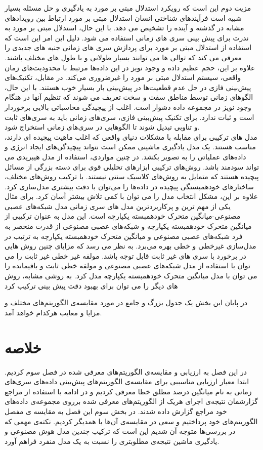  مزیت دوم این است که رویکرد استدلال مبتی بر مورد به یادگیری و حل مسئله بسیار شبیه است
فرآیندهای شناختی انسان استدلال مبتی بر مورد ارتباط بین رویدادهای مشابه در گذشته و آینده را تشخیص می دهد. با این حال، استدلال مبتی بر مورد به ندرت برای پیش بینی سری های زمانی استفاده می شود.
 دلیل این امر این است که استفاده از استدلال مبتی بر مورد برای پردازش سری های زمانی جنبه های جدیدی را معرفی می کند که توالی ها می توانند بسیار طولانی و با طول های مختلف باشند. 
 علاوه بر این، حجم عظیم داده و وجود نویز در این داده‌ها مرتبط با محدودیت‌های زمان واقعی، سیستم استدلال مبتی بر مورد را غیرضروری می‌کند.
  در مقابل، تکنیک‌های پیش‌بینی فازی در حل عدم قطعیت‌ها در پیش‌بینی بار بسیار خوب هستند.
 با این حال، الگوهای زمانی توسط مناطق سفت و سخت تعریف می شوند که تنظیم آنها در هنگام وجود نویز در مجموعه داده دشوار است. 
 اغلب از پیچیدگی محاسباتی بالایی برخوردار است و ثبات ندارد.
  برای تکنیک پیش‌بینی فازی، سری‌های زمانی باید به سری‌های ثابت و تناوبی تبدیل شوند تا الگوهایی در سری‌های زمانی استخراج شود.
  \\
  مدل های ترکیبی برای مقابله با مشکلات دنیای واقعی که
   اغلب ماهیت پیچیده ای دارند، مناسب هستند. یک مدل یادگیری ماشینی ممکن است نتواند پیچیدگی‌های ایجاد انرژی و داده‌های عملیاتی را به تصویر بکشد.
   در چنین مواردی، استفاده از مدل هیبریدی می تواند سودمند باشد. روش‌های ترکیبی ابزارهای تحلیلی قوی برای دسته بزرگی از مسائل پیچیده هستند
   که متمایل به روش‌های کلاسیک سنتی نیستند. با ترکیب روش‌های مختلف، ساختارهای خودهمبستگی پیچیده در داده‌ها را می‌توان با دقت بیشتری مدل‌سازی کرد. 
  علاوه بر این، مشکل انتخاب مدل را می توان با کمی تلاش بیشتر آسان کرد. برای مثال یکی از مهم ترین و پرکاربردترین مدل های سری زمانی مدل شبکه‌های عصبی مصنوعی-میانگین متحرک خودهمبسته یکپارچه
   است. این مدل به عنوان ترکیبی 
  از میانگین متحرک خودهمبسته یکپارچه و شبکه‌های عصبی مصنوعی از قدرت منحصر به فرد شبکه‌های عصبی مصنوعی و میانگین متحرک خودهمبسته یکپارچه به ترتیب در مدل‌سازی غیرخطی و خطی بهره می‌برد. به نظر می رسد که مزایای چنین روش هایی در برخورد
   با سری های غیر ثابت قابل توجه باشد. مولفه غیر خطی غیر ثابت را می توان با استفاده از مدل شبکه‌های عصبی مصنوعی و مولفه خطی ثابت
    و باقیمانده را می توان با مدل میانگین متحرک خودهمبسته یکپارچه مدل کرد. به روشی مشابه، روش های دیگر را می توان برای بهبود دقت پیش بینی ترکیب کرد


    در پایان این بخش یک جدول بزرگ و جامع در مورد مقایسه‌ی الگوریتم‌های مختلف و مزایا و معایب هرکدام خواهد آمد.
\section{خلاصه}


در این فصل به ارزیابی و مقایسه‌ی الگوریتم‌های معرفی شده در فصل سوم کردیم. ابتدا معیار ارزیابی مناسببی برای مقایسه‌ی الگوریتم‌های پیش‌بینی داده‌های سری‌های زمانی
به نام میانگین درصد مطلق خطا
معرفی کردیم و در ادامه با استفاده از مراجع گزارشمان نتیجه‌ی اجرای هریک از الگوریتم‌های معرفی شده برروی مجموعه‌ی داده‌های خود مراجع گزارش داده شدند. 
در بخش سوم این فصل به مقایسه ی مفصل الگوریتم‌های خود پرداختیم و سعی در مقایسه‌ی آن‌ها با همدیگر کردیم. 
نکته‌ی مهمی که در بررسی‌ها متوجه آن شدیم این است که ترکیب چندین مدل هوش مصنوعی و یادگیری ماشین نتیجه‌ی مطلوبتری را
نسبت به یک مدل منفرد فراهم آورد. 

